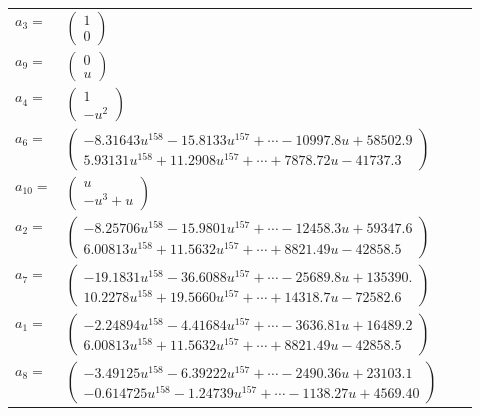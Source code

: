 \documentclass[1p]{elsarticle_modified}
\theoremstyle{definition}
\begin{document}
\begin{tabular}{m{7pt} m{180pt} m{7pt} m{180pt} }
\flushright $a_{3}=$&$\begin{pmatrix}1\\0\end{pmatrix}$ \\
\flushright $a_{9}=$&$\begin{pmatrix}0\\u\end{pmatrix}$ \\
\flushright $a_{4}=$&$\begin{pmatrix}1\\- u^2\end{pmatrix}$ \\
\flushright $a_{6}=$&$\begin{pmatrix}-8.31643 u^{158}-15.8133 u^{157}+\cdots-10997.8 u+58502.9\\5.93131 u^{158}+11.2908 u^{157}+\cdots+7878.72 u-41737.3\end{pmatrix}$ \\
\flushright $a_{10}=$&$\begin{pmatrix}u\\- u^3+u\end{pmatrix}$ \\
\flushright $a_{2}=$&$\begin{pmatrix}-8.25706 u^{158}-15.9801 u^{157}+\cdots-12458.3 u+59347.6\\6.00813 u^{158}+11.5632 u^{157}+\cdots+8821.49 u-42858.5\end{pmatrix}$ \\
\flushright $a_{7}=$&$\begin{pmatrix}-19.1831 u^{158}-36.6088 u^{157}+\cdots-25689.8 u+135390.\\10.2278 u^{158}+19.5660 u^{157}+\cdots+14318.7 u-72582.6\end{pmatrix}$ \\
\flushright $a_{1}=$&$\begin{pmatrix}-2.24894 u^{158}-4.41684 u^{157}+\cdots-3636.81 u+16489.2\\6.00813 u^{158}+11.5632 u^{157}+\cdots+8821.49 u-42858.5\end{pmatrix}$ \\
\flushright $a_{8}=$&$\begin{pmatrix}-3.49125 u^{158}-6.39222 u^{157}+\cdots-2490.36 u+23103.1\\-0.614725 u^{158}-1.24739 u^{157}+\cdots-1138.27 u+4569.40\end{pmatrix}$ \\

\end{tabular}
\end{document}
